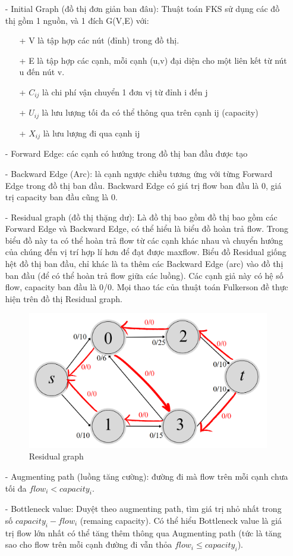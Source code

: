 \documentclass[a4paper]{article}
\begin{document}
\begin{enumerate}
    \item[-] {Initial Graph (đồ thị đơn giản ban đâu): Thuật toán FKS sử dụng các đồ thị gồm 1 nguồn, và 1 đích G(V,E) với:}
    \begin{enumerate}
        \item[+] {V là tập hợp các nút (đỉnh) trong đồ thị.}
        \item[+] {E là tập hợp các cạnh, mỗi cạnh (u,v) đại diện cho một liên kết từ nút u đến nút v.}
        \item[+] {$C_{ij}$ là chi phí vận chuyển 1 đơn vị từ đỉnh i đến j}
        \item[+] {$U_{ij}$ là lưu lượng tối đa có thể thông qua trên cạnh ij (capacity) }
        \item[+] {$X_{ij}$ là lưu lượng đi qua cạnh ij } 
    \end{enumerate}
    \item[-] {Forward Edge: các cạnh có hướng trong đồ thị ban đầu được tạo}
    \item[-] {Backward Edge (Arc): là cạnh ngược chiều tương ứng với từng Forward Edge trong đồ thị ban đầu. Backward Edge có giá trị flow ban đầu là 0, giá trị capacity ban đầu cũng là 0. }
    \item[-] {Residual graph (đồ thị thặng dư): Là đồ thị bao gồm đồ thị bao gồm các Forward Edge và Backward Edge, có thể hiểu là biểu đồ hoàn trả flow. Trong biểu đồ này ta có thể hoàn trả flow từ các cạnh khác nhau và chuyển hướng của chúng đến vị trí hợp lí hơn để đạt được maxflow. Biểu đồ Residual giống hệt đồ thị ban đầu, chỉ khác là ta thêm các Backward Edge (arc) vào đồ thị ban đầu (để có thể hoàn trả flow giữa các luồng). Các cạnh giả này có hệ số flow, capacity ban đầu là 0/0. Mọi thao tác của thuật toán Fulkerson đề thực hiện trên đồ thị Residual graph.} 
    \begin{figure}[h]
        \centering
        \includegraphics[width=0.5\linewidth]{graph1.png}
        \caption{Residual graph}
        \label{fig:enter-label}
    \end{figure} 
    \item[-] {Augmenting path (luồng tăng cường): đường đi mà flow trên mỗi cạnh chưa tối đa  ${flow}_{i} < {capacity}_i$. } 
    \item[-] {Bottleneck value: Duyệt theo augmenting path, tìm giá trị nhỏ nhất trong số $capacity_i  - flow_i$ (remaing capacity). Có thể hiểu Bottleneck value là giá trị flow lớn nhất có thể tăng thêm thông qua Augmenting path (tức là tăng sao cho flow trên	 mỗi cạnh đường đi vẫn thỏa $flow_i \leq capacity_i$).} 
\end{enumerate}
\end{document}
